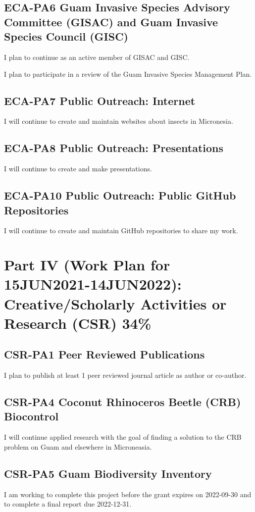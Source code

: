 \subsection{ECA-PA6 Guam Invasive Species Advisory Committee (GISAC) and Guam Invasive Species Council (GISC)}
I plan to continue as an active member of GISAC and GISC.

I plan to participate in a review of the Guam Invasive Species Management Plan.

\subsection{ECA-PA7 Public Outreach: Internet}
I will continue to create and maintain websites about insects in Micronesia.

\subsection{ECA-PA8 Public Outreach: Presentations}
I will continue to create and make presentations.

\subsection{ECA-PA10 Public Outreach: Public GitHub Repositories}
I will continue to create and maintain GitHub repositories to share my work.

\newpage
\section{Part IV (Work Plan for 15JUN2021-14JUN2022): Creative/Scholarly Activities or Research (CSR) 34\%}

\subsection{CSR-PA1 Peer Reviewed Publications} 
I plan to publish at least 1 peer reviewed journal article as author or co-author.

\subsection{CSR-PA4 Coconut Rhinoceros Beetle (CRB) Biocontrol}

I will continue applied research with the goal of finding a solution to the CRB problem on Guam and elsewhere in Microneasia. 

\subsection{CSR-PA5 Guam Biodiversity Inventory}I am working to complete this project before the grant expires on 2022-09-30 and to complete a final report due 2022-12-31.

